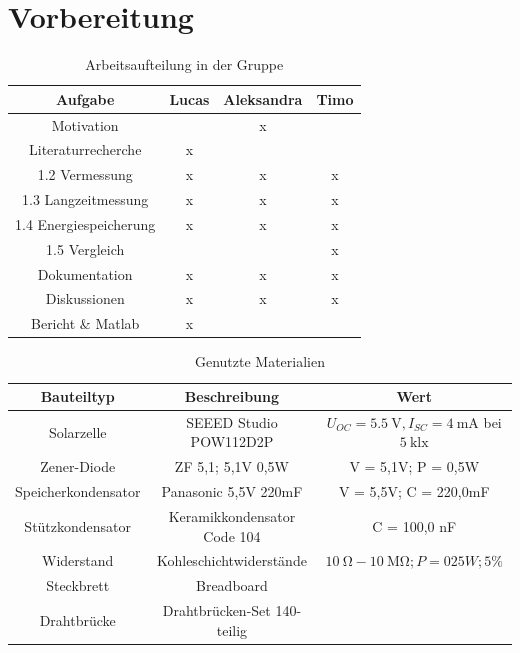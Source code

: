 \section{Vorbereitung}

\begin{table}[htb]
\centering
\caption{Arbeitsaufteilung in der Gruppe}
\label{Arbeitsaufteilung}
\begin{tabular}{c|ccc}
\toprule
Aufgabe & Lucas & Aleksandra & Timo\\
\midrule
Motivation &  & x & \\
Literaturrecherche & x &  & \\
1.2 Vermessung & x & x & x\\
1.3 Langzeitmessung & x & x & x\\
1.4 Energiespeicherung & x & x & x\\
1.5 Vergleich &  &  & x\\
Dokumentation & x & x & x\\
Diskussionen & x & x & x\\
Bericht \& Matlab & x &  & \\
\bottomrule
\end{tabular}
\end{table}

\begin{table}[htb]
\centering
\caption{Genutzte Materialien}
\label{Arbeitsaufteilung}
\begin{tabular}{c|c|c}
\toprule
Bauteiltyp & Beschreibung & Wert\\
\midrule
Solarzelle & SEEED Studio POW112D2P & $U_{OC} = \SI{5,5}{\volt}, I_{SC} = \SI{4}{\milli\ampere}$ bei $\SI{5}{\kilo\lux}$\\
Zener-Diode & ZF 5,1; 5,1V 0,5W & V = 5,1V; P = 0,5W\\
Speicherkondensator & Panasonic 5,5V 220mF & V = 5,5V; C = 220,0mF\\
Stützkondensator & Keramikkondensator Code 104 & C = 100,0 nF\\
Widerstand & Kohleschichtwiderstände & $\SI{10}{\ohm} - \SI{10}{\mega\ohm}; P = 025W; 5\%$\\
Steckbrett & Breadboard & \\
Drahtbrücke & Drahtbrücken-Set 140-teilig & \\
\bottomrule
\end{tabular}
\end{table}

